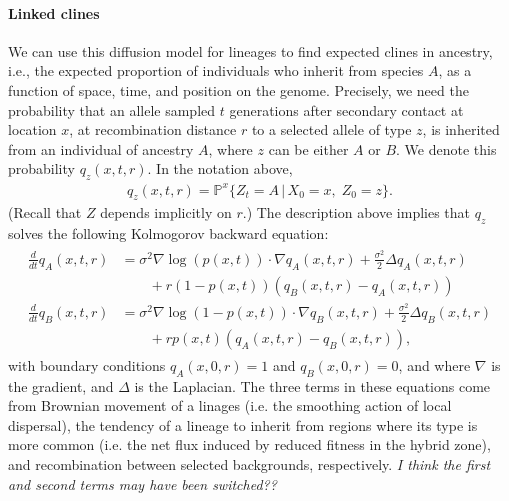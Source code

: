 \documentclass[11pt,letterpaper]{article}
\newcommand{\alisa}[1]{{\em \color{red} #1}}
\newcommand{\plr}[1]{{\em \color{blue} #1}}
\renewcommand{\P}{\mathbb{P}}
\newcommand{\grad}{\nabla}
\newcommand{\given}{\,\vert\,}
\begin{document}
\paragraph{Linked clines}
We can use this diffusion model for lineages to find expected clines in ancestry,
i.e., the expected proportion of individuals who inherit from species $A$,
as a function of space, time, and position on the genome.
Precisely, we need the probability that 
an allele sampled $t$ generations after secondary contact at location $x$,
at recombination distance $r$ to a selected allele of type $z$,
is inherited from an individual of ancestry $A$,
where $z$ can be either $A$ or $B$.
We denote this probability $q_z(x,t,r)$.
In the notation above,
\begin{align}
    q_z(x,t,r) = \P^x \{Z_t = A \given X_0 = x, \; Z_0 = z\} .
\end{align}
(Recall that $Z$ depends implicitly on $r$.) 
The description above implies that $q_z$ solves the following Kolmogorov backward equation:
\begin{align}
    \begin{aligned}  \label{eqn:q_pde}
    \frac{d}{dt} q_A(x,t,r) 
            &= \sigma^2 \grad \log(p(x,t)) \cdot \grad q_A(x,t,r) 
                + \frac{\sigma^2}{2} \Delta q_A(x,t,r) 
            \\ &\qquad {} + 
                r (1-p(x,t))(q_B(x,t,r)-q_A(x,t,r))  \\
    \frac{d}{dt} q_B(x,t,r) &= \sigma^2 \grad \log(1-p(x,t)) \cdot \grad q_B(x,t,r) 
            + \frac{\sigma^2}{2} \Delta q_B(x,t,r)
            \\ &\qquad {} + 
            r p(x,t) (q_A(x,t,r)-q_B(x,t,r))  ,
    \end{aligned} 
\end{align}
with boundary conditions $q_A(x,0,r)=1$ and $q_B(x,0,r)=0$, 
and where $\grad$ is the gradient, and $\Delta$ is the Laplacian.
The three terms in these equations come from Brownian movement of a linages (i.e. the smoothing action of local dispersal),
the tendency of a lineage to inherit from regions where its type is more common (i.e. the net flux induced by reduced fitness in the hybrid zone),
and recombination between selected backgrounds, respectively. \alisa{I think the first and second terms may have been switched??}
\end{document}
